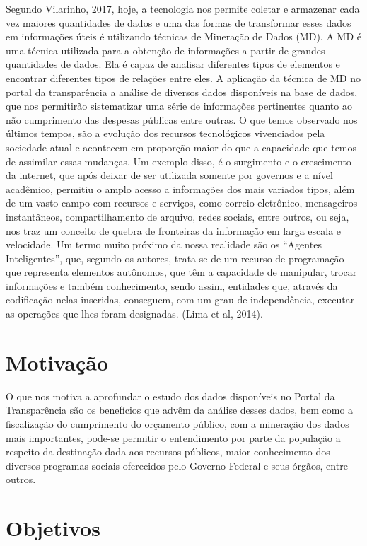 Segundo Vilarinho, 2017, hoje, a tecnologia nos permite coletar e armazenar cada vez maiores quantidades de dados e uma das formas de transformar esses dados em informações úteis é utilizando técnicas de Mineração de Dados (MD). A MD é uma técnica utilizada para a obtenção de informações a partir de grandes quantidades de dados. Ela é capaz de analisar diferentes tipos de elementos e encontrar diferentes tipos de relações entre eles. A aplicação da técnica de MD no portal da transparência a análise de diversos dados disponíveis na base de dados, que nos permitirão sistematizar uma série de informações pertinentes quanto ao não cumprimento das despesas públicas entre outras. O que temos observado nos últimos tempos, são a evolução dos recursos tecnológicos vivenciados pela sociedade atual e acontecem em proporção maior do que a capacidade que temos de assimilar essas mudanças. Um exemplo disso, é o surgimento e o crescimento da internet, que após deixar de ser utilizada somente por governos e a nível acadêmico, permitiu o amplo acesso a informações dos mais variados tipos, além de um vasto campo com recursos e serviços, como correio eletrônico, mensageiros instantâneos, compartilhamento de arquivo, redes sociais, entre outros, ou seja, nos traz um conceito de quebra de fronteiras da informação em larga escala e velocidade. Um termo muito próximo da nossa realidade são os “Agentes Inteligentes”, que, segundo os autores, trata-se de um recurso de programação que representa elementos autônomos, que têm a capacidade de manipular, trocar informações e também conhecimento, sendo assim, entidades que, através da codificação nelas inseridas, conseguem, com um grau de independência, executar as operações que lhes foram designadas. (Lima et al, 2014). 

\section{Motivação}
O que nos motiva a aprofundar o estudo dos dados disponíveis no Portal da Transparência são os benefícios que advêm da análise desses dados, bem como a fiscalização do cumprimento do orçamento público, com a mineração dos dados mais importantes, pode-se permitir o entendimento por parte da população a respeito da destinação dada aos recursos públicos, maior conhecimento dos diversos programas sociais oferecidos pelo Governo Federal e seus órgãos, entre outros. 



\section{Objetivos}
